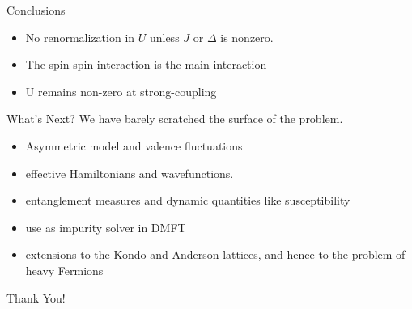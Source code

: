 \documentclass[aspectratio=169]{beamer}
\begin{document}
\begin{frame}{Conclusions}
\begin{itemize} 
	\item No renormalization in \(U\) unless \(J\) or \(\Delta\) is nonzero.
		\vspace{10pt}
	\item The spin-spin interaction is the main interaction
		\vspace{10pt}
	\item U remains non-zero at strong-coupling
\end{itemize}
\end{frame}

\begin{frame}{What's Next?}
We have barely scratched the surface of the problem.
\vspace{10pt}
\begin{itemize} 
\item Asymmetric model and valence fluctuations
	\vspace{10pt}
\item effective Hamiltonians and wavefunctions.
	\vspace{10pt}
\item entanglement measures and dynamic quantities like susceptibility
	\vspace{10pt}
\item use as impurity solver in DMFT
	\vspace{10pt}
\item extensions to the Kondo and Anderson lattices, and hence to the problem of heavy Fermions
\end{itemize}
\end{frame}
\begin{frame}
	\LARGE \centering Thank You!
\end{frame}
\end{document}

